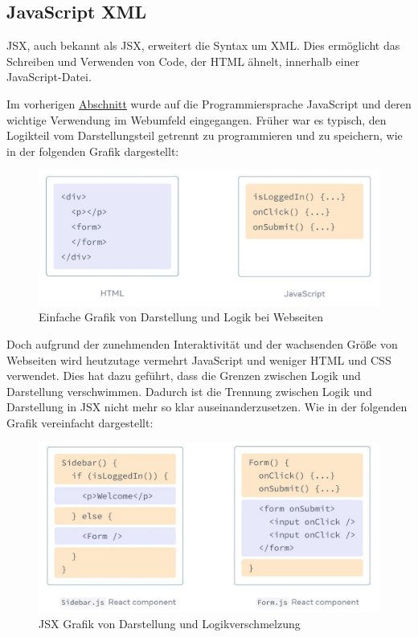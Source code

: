 \subsection{JavaScript XML}

\acl{JSX}, auch bekannt als \acs{JSX}, erweitert die Syntax um \acf{XML}. Dies ermöglicht das Schreiben und Verwenden von Code, der \acs{HTML} ähnelt, innerhalb einer JavaScript-Datei.

Im vorherigen \hyperref[chapter:3-javaScript]{Abschnitt} wurde auf die Programmiersprache JavaScript und deren wichtige Verwendung im Webumfeld eingegangen. Früher war es typisch, den Logikteil vom Darstellungsteil getrennt zu programmieren und zu speichern, wie in der folgenden Grafik dargestellt:

\begin{figure}[h]
    \centering
    \includegraphics[width=1\textwidth]{images/02/ReactJS-JSX.jpeg}
    \caption{Einfache Grafik von Darstellung und Logik bei Webseiten\cite{react-jsx-html, react-jsx-javascript}}
\end{figure}

Doch aufgrund der zunehmenden Interaktivität und der wachsenden Größe von Webseiten wird heutzutage vermehrt JavaScript und weniger \acs{HTML} und \acs{CSS} verwendet. Dies hat dazu geführt, dass die Grenzen zwischen Logik und Darstellung verschwimmen. Dadurch ist die Trennung zwischen Logik und Darstellung in \acs{JSX} nicht mehr so klar auseinanderzusetzen. Wie in der folgenden Grafik vereinfacht dargestellt:

\begin{figure}[h]
    \centering
    \includegraphics[width=1\textwidth]{images/02/ReactJS-JSX-Component.jpeg}
    \caption{JSX Grafik von Darstellung und Logikverschmelzung\cite{react-jsx-form-component, react-jsx-sidebar-component}}
\end{figure}

